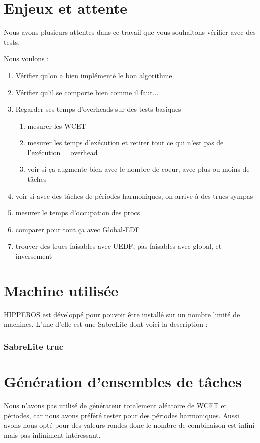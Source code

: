 \section{Enjeux et attente}

	Nous avons plusieurs attentes dans ce travail que vous souhaitons vérifier avec des tests.
	
	Nous voulons :
	\begin{enumerate}
		\item Vérifier qu'on a bien implémenté le bon algorithme
		\item Vérifier qu'il se comporte bien comme il faut...
		\item Regarder ses temps d'overheads sur des tests basiques
		\begin{enumerate}
			\item mesurer les WCET
			\item mesurer les temps d'exécution et retirer tout ce qui n'est pas de l'exécution = overhead
			\item voir si ça augmente bien avec le nombre de coeur, avec plus ou moins de tâches
		\end{enumerate}
		\item voir si avec des tâches de périodes harmoniques, on arrive à des trucs sympas
		\item mesurer le temps d'occupation des procs
		\item comparer pour tout ça avec Global-EDF
		\item trouver des trucs faisables avec UEDF, pas faisables avec global, et inversement
	\end{enumerate}
	
	
\section{Machine utilisée}
	HIPPEROS est développé pour pouvoir être installé sur un nombre limité de machines. 
	L'une d'elle est une SabreLite dont voici la description :
	
	\subsubsection{SabreLite truc}
	

\section{Génération d'ensembles de tâches}

	Nous n'avons pas utilisé de générateur totalement aléatoire de WCET et périodes, 
	car nous avons préféré tester pour des périodes harmoniques. Aussi 
	avons-nous opté pour des valeurs \og{}rondes\fg{} donc le nombre de combinaison est infini 
	mais pas infiniment intéressant.
	
